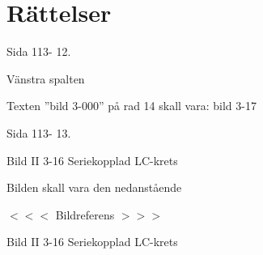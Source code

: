 \section{Rättelser}

\onecolumn

Sida 113- 12.

Vänstra spalten

Texten ''bild 3-000'' på rad 14 skall vara: bild 3-17

Sida 113- 13.

Bild II 3-16 Seriekopplad LC-krets

Bilden skall vara den nedanstående

$<<<$ Bildreferens $>>>$

Bild II 3-16 Seriekopplad LC-krets

\twocolumn